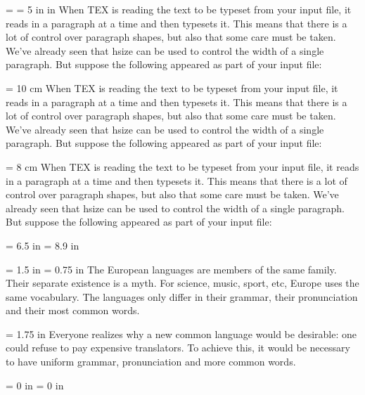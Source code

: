 \magnification = 
\hsize = 5 in 
 in
\footline{\hfil --\the\pageno-- \hfil}
When TEX is reading the text to be typeset from your input file, it reads in a paragraph
at a time and then typesets it. This means that there is a lot of control over paragraph
shapes, but also that some care must be taken. We’ve already seen that  hsize can be used
to control the width of a single paragraph. But suppose the following appeared as part of
your input file:

\hsize = 10 cm
When TEX is reading the text to be typeset from your input file, it reads in a paragraph
at a time and then typesets it. This means that there is a lot of control over paragraph
shapes, but also that some care must be taken. We’ve already seen that hsize can be used
to control the width of a single paragraph. But suppose the following appeared as part of
your input file:

\hsize = 8 cm
When TEX is reading the text to be typeset from your input file, it reads in a paragraph
at a time and then typesets it. This means that there is a lot of control over paragraph
shapes, but also that some care must be taken. We’ve already seen that hsize can be used
to control the width of a single paragraph. But suppose the following appeared as part of
your input file:

\hsize = 6.5 in
\vsize = 8.9 in

\leftskip = 1.5 in
\rightskip = 0.75 in
The European languages are members of the same family. Their separate existence is a myth. For science, music, sport, etc, Europe uses the same vocabulary. The languages only differ in their grammar, their pronunciation and their most common words.

\rightskip = 1.75 in
Everyone realizes why a new common language would be desirable: one could refuse to pay expensive translators. To achieve this, it would be necessary to have uniform grammar, pronunciation and more common words.

\leftskip = 0 in
\rightskip = 0 in

